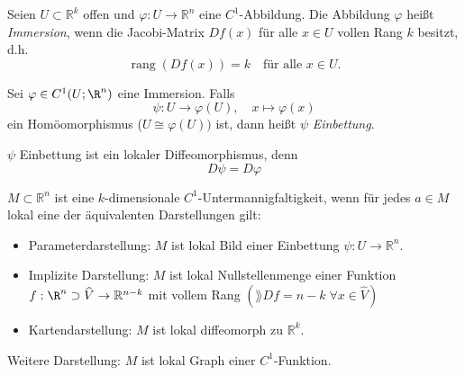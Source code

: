 \documentclass[11pt, a4paper]{article}
\begin{document}
\begin{definition} 
Seien $U \subset \mathbb{R}^k$ offen und $\varphi : U \to \mathbb{R}^n$ eine $C^1$-Abbildung. Die Abbildung $\varphi$ heißt \emph{Immersion}, wenn die Jacobi-Matrix $Df(x)$ für alle $x \in U$  vollen Rang $k$ besitzt, d.h.
\[
\operatorname{rang}(Df(x)) = k 
\quad \text{für alle } x \in U.
\]
    
\end{definition}

\begin{definition} 
    Sei $\varphi \in C^1(U;\R^n)$ eine Immersion. Falls 
    $$\psi: U \to \varphi(U),\quad x \mapsto \varphi(x)$$ ein Homöomorphismus ($U\cong \varphi(U))$ ist, dann heißt $\psi$ \emph{Einbettung}.
\end{definition}

\begin{note} $\psi$ Einbettung ist ein lokaler Diffeomorphismus, denn $$D\psi = D\varphi$$
\end{note}


\begin{definition}  $M \subset \mathbb{R}^n$ ist eine $k$-dimensionale $C^1$-Untermannigfaltigkeit,
wenn für jedes $a\in M$ lokal eine der äquivalenten Darstellungen gilt:

\begin{itemize}
\item[(a)] Parameterdarstellung: $M$ ist lokal Bild einer Einbettung
$\psi:U \to \mathbb{R}^n$.

\item[(b)] Implizite Darstellung: $M$ ist lokal Nullstellenmenge einer Funktion\\  $f: \R^n\supset \widehat V \to \mathbb{R}^{n-k}$ mit vollem Rang $(\rang{Df} = n-k \; \forall x \in \widehat V)$

\item[(c)] Kartendarstellung: $M$ ist lokal diffeomorph zu $\mathbb{R}^k$.
\end{itemize}

Weitere Darstellung: $M$ ist lokal Graph einer $C^1$-Funktion.
\end{definition}
\end{document}
